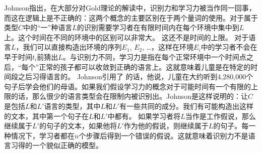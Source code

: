 Johnson指出，在大部分对Gold理论的解读中，识别力和学习力被当作同一回事，而这在逻辑上是不正确的：这两个概念的主要区别在于两个量词的使用。对于属于类型$C$中的“一”种语言$L$的识别需要学习者在有限时间内在每个环境中集中到$L$上。这个时间在不同的环境中的区别可以非常大。
这还不是时间的上限。
对于语言$L$，我们可以直接构造出环境的序列$E_1$, $E_2$, \ldots{}，这样在环境$E_i$中的学习者不会在早于时间$t_i$前猜出$L$。与识别力不同，学习力是指在每个正常环境中一个时间点之后，“每个”正常的孩子都可以收敛到正确的语言上。这就意味着儿童是在特定的时间段之后习得语言的。
 Johnson引用了 \citet[]{Morgan89a}的话，他说，儿童在大约听到4,280,000个句子后学会他们的母语。如果我们假设学习力的概念对于可能时间有一个有限的上限的话，那么很少的语言类型会在限制内被识别出。Johnson是这样说明的：让$C$是包括$L$和$L'$语言的类型，其中$L$和$L'$有一些共同的成分。我们有可能构造出这样的文本，其中第一个句子在$L$和$L'$中都有。
如果学习者将$L$当作是工作假说，那么继续属于$L'$的句子的文本，如果他将$L'$作为他的假说，则继续属于$L$的句子。每一种情况下，学习者都在$n$个步骤后得到一个错误的假说。这就意味着识别力不是语言习得的一个貌似正确的模型。

